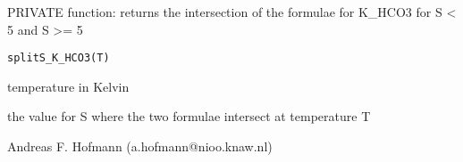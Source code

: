 \documentclass{article}
\begin{document}
\begin{Description}\relax
PRIVATE function: returns the intersection of the formulae for K\_HCO3 for S < 5 and S >= 5
\end{Description}
\begin{Usage}
\begin{verbatim}splitS_K_HCO3(T)\end{verbatim}
\end{Usage}
\begin{Arguments}
\begin{ldescription}
\item[\code{T }] temperature in Kelvin
\end{ldescription}
\end{Arguments}
\begin{Value}
the value for S where the two formulae intersect at temperature T
\end{Value}
\begin{Author}\relax
Andreas F. Hofmann (a.hofmann@nioo.knaw.nl)
\end{Author}
\end{document}
